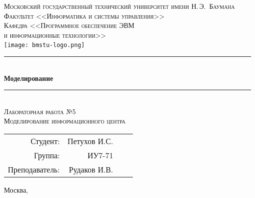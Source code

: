 \newcommand{\HRule}{\rule{\linewidth}{0.5mm}}

\begin{center}

\textsc{\large Московский государственный технический университет имени Н.\,Э.~Баумана}\\[0.5cm]
\textsc{Факультет <<Информатика и системы управления>>}\\
\textsc{Кафедра <<Программное обеспечение ЭВМ\\и информационные технологии>>}\\[0.25cm]

\texttt{[image: bmstu-logo.png]}~\\[2.25cm]



\HRule \\[0.5cm]
{\huge \bfseries Моделирование}
\HRule \\[0.5cm]

\textsc{\large Лабораторная работа №5}\\
\textsc{Моделирование информационного центра}

\vfill

\begin{flushright}
  \begin{tabular}{rrlc}
    Студент: & Петухов И.С.\\
    Группа: & ИУ7-71\\
    Преподаватель: & Рудаков И.В.\\
  \end{tabular}
\end{flushright}

{\large Москва, \the\year}

\end{center}

\newpage
{}